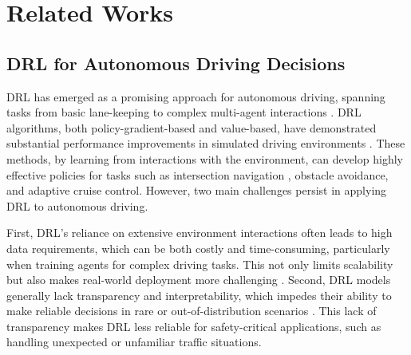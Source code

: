\section{Related Works}
\subsection{DRL for Autonomous Driving Decisions}
DRL has emerged as a promising approach for autonomous driving, spanning tasks from basic lane-keeping to complex multi-agent interactions \cite{liu2024cooperative, xu2018reinforcement}. DRL algorithms, both policy-gradient-based and value-based, have demonstrated substantial performance improvements in simulated driving environments \cite{schulman2017proximal, mnih2013playing}. These methods, by learning from interactions with the environment, can develop highly effective policies for tasks such as intersection navigation \cite{li2022decision}, obstacle avoidance, and adaptive cruise control. However, two main challenges persist in applying DRL to autonomous driving.

First, DRL’s reliance on extensive environment interactions often leads to high data requirements, which can be both costly and time-consuming, particularly when training agents for complex driving tasks. This not only limits scalability but also makes real-world deployment more challenging \cite{kiran2021deep}. Second, DRL models generally lack transparency and interpretability, which impedes their ability to make reliable decisions in rare or out-of-distribution scenarios \cite{zhu2021survey}. This lack of transparency makes DRL less reliable for safety-critical applications, such as handling unexpected or unfamiliar traffic situations.


